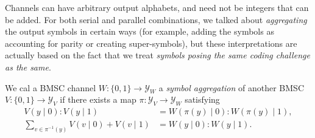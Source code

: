 \begin{remark}
    Channels can have arbitrary output alphabets, and need not be integers that can be added. For both serial and parallel combinations, we talked about \textit{aggregating} the output symbols in certain ways (for example, adding the symbols as accounting for parity or creating super-symbols), but these interpretations are actually based on the fact that we treat \textit{symbols posing the same coding challenge as the same}.

    We cal a BMSC channel $W:\{0,1\}\rightarrow\mathcal{Y}_W$ a \textit{symbol aggregation} of another BMSC $V:\{0,1\}\rightarrow\mathcal{Y}_V$ if there exists a map $\pi:\mathcal{Y}_V\rightarrow\mathcal{Y}_W$ satisfying
    \begin{equation}\begin{aligned}
        V(y\mid0):V(y\mid1) &= W(\pi(y)\mid0):W(\pi(y)\mid1), \\
        \sum_{v\in\pi^{-1}(y)}V(v\mid0)+V(v\mid1) &= W(y\mid0):W(y\mid1).
    \end{aligned}\end{equation}
\end{remark}
